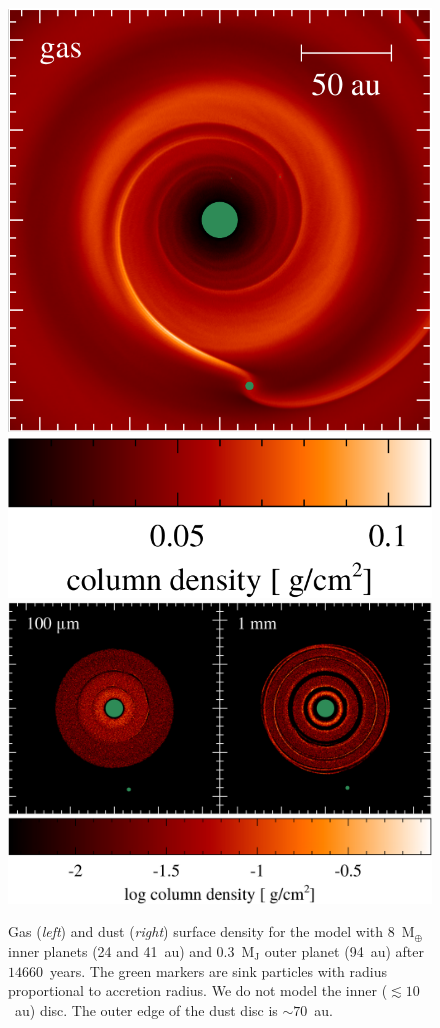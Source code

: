 \documentclass[usenatbib,a4paper,times]{mnras}
\renewcommand{\earth}{\mathrm{M}_{\oplus}}
\begin{document}
\begin{figure}
   \begin{center}
      \includegraphics[width=0.496\columnwidth]{figs/gas.pdf}
      \includegraphics[width=0.496\columnwidth]{figs/dust.pdf}
      \caption{Gas (\textit{left}) and dust (\textit{right}) surface density for
         the model with 8~$\earth{}$ inner planets (24 and 41~au) and
         0.3~$\mathrm{M_J}$ outer planet (94~au) after $14660$~years. The
         green markers are sink particles with radius proportional to accretion
         radius. We do not model the inner ($\lesssim 10$~au) disc. The outer
         edge of the dust disc is $\sim 70$~au.\label{fig:surface-density}}
   \end{center}
\end{figure}
\end{document}
